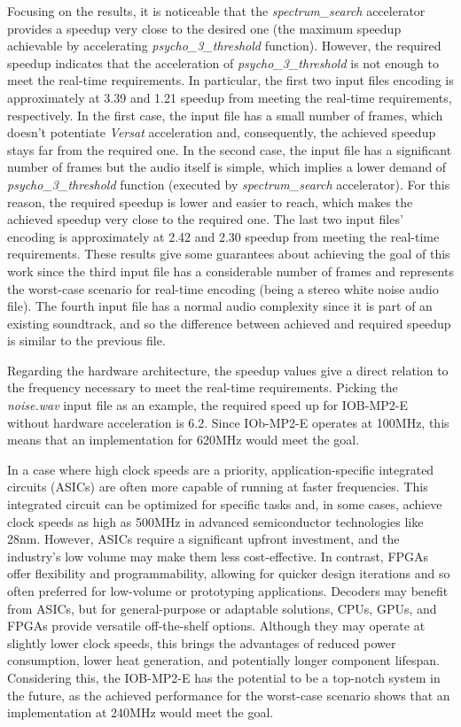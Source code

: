 Focusing on the results, it is noticeable that the \textit{spectrum\_search} accelerator provides a speedup very close to the desired one (the maximum speedup achievable by accelerating \textit{psycho\_3\_threshold} function).
However, the required speedup indicates that the acceleration of \textit{psycho\_3\_threshold} is not enough to meet the real-time requirements. 
In particular, the first two input files encoding is approximately at 3.39 and 1.21 speedup from meeting the real-time requirements, respectively. In the first case, the input file has a small number of frames, which doesn't potentiate \textit{Versat} acceleration and, consequently, the achieved speedup stays far from the required one.
In the second case, the input file has a significant number of frames but the audio itself is simple, which implies a lower demand of \textit{psycho\_3\_threshold} function (executed by \textit{spectrum\_search} accelerator). For this reason, the required speedup is lower and easier to reach, which makes the achieved speedup very close to the required one.
The last two input files' encoding is approximately at 2.42 and 2.30 speedup from meeting the real-time requirements. These results give some guarantees about achieving the goal of this work since the third input file has a considerable number of frames and represents the worst-case scenario for real-time encoding (being a stereo white noise audio file). The fourth input file has a normal audio complexity since it is part of an existing soundtrack, and so the difference between achieved and required speedup is similar to the previous file.

Regarding the hardware architecture, the speedup values give a direct relation to the frequency necessary to meet the real-time requirements. Picking the \textit{noise.wav} input file as an example, the required speed up for IOB-MP2-E without hardware acceleration is 6.2. Since IOb-MP2-E operates at 100MHz, this means that an implementation for 620MHz would meet the goal. 

In a case where high clock speeds are a priority, application-specific integrated circuits (ASICs) are often more capable of running at faster frequencies. This integrated circuit can be optimized for specific tasks and, in some cases, achieve clock speeds as high as 500MHz in advanced semiconductor technologies like 28nm.
However, ASICs require a significant upfront investment, and the industry's low volume may make them less cost-effective. In contrast, FPGAs offer flexibility and programmability, allowing for quicker design iterations and so often preferred for low-volume or prototyping applications.
Decoders may benefit from ASICs, but for general-purpose or adaptable solutions, CPUs, GPUs, and FPGAs provide versatile off-the-shelf options. Although they may operate at slightly lower clock speeds, this brings the advantages of reduced power consumption, lower heat generation, and potentially longer component lifespan.
Considering this, the IOB-MP2-E has the potential to be a top-notch system in the future, as the achieved performance for the worst-case scenario shows that an implementation at 240MHz would meet the goal.